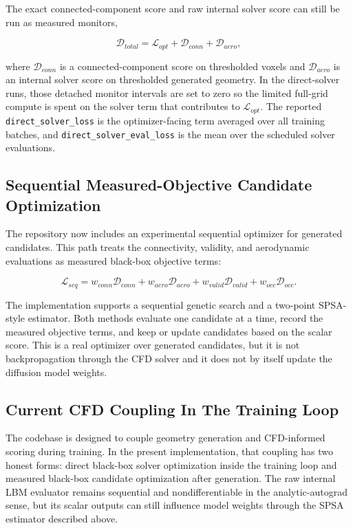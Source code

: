 The exact connected-component score and raw internal solver score can still be run as measured monitors,

\begin{equation}
\mathcal{D}_{total} = \mathcal{L}_{opt} + \mathcal{D}_{conn} + \mathcal{D}_{aero},
\end{equation}

where \(\mathcal{D}_{conn}\) is a connected-component score on thresholded voxels and \(\mathcal{D}_{aero}\) is an internal solver score on thresholded generated geometry. In the direct-solver runs, those detached monitor intervals are set to zero so the limited full-grid compute is spent on the solver term that contributes to \(\mathcal{L}_{opt}\). The reported \texttt{direct\_solver\_loss} is the optimizer-facing term averaged over all training batches, and \texttt{direct\_solver\_eval\_loss} is the mean over the scheduled solver evaluations.

\subsection{Sequential Measured-Objective Candidate Optimization}
The repository now includes an experimental sequential optimizer for generated candidates. This path treats the connectivity, validity, and aerodynamic evaluations as measured black-box objective terms:

\begin{equation}
\mathcal{L}_{seq} =
w_{conn}\mathcal{D}_{conn}
+ w_{aero}\mathcal{D}_{aero}
+ w_{valid}\mathcal{D}_{valid}
+ w_{occ}\mathcal{D}_{occ}.
\end{equation}

The implementation supports a sequential genetic search and a two-point SPSA-style estimator. Both methods evaluate one candidate at a time, record the measured objective terms, and keep or update candidates based on the scalar score. This is a real optimizer over generated candidates, but it is not backpropagation through the CFD solver and it does not by itself update the diffusion model weights.

\subsection{Current CFD Coupling In The Training Loop}
The codebase is designed to couple geometry generation and CFD-informed scoring during training. In the present implementation, that coupling has two honest forms: direct black-box solver optimization inside the training loop and measured black-box candidate optimization after generation. The raw internal LBM evaluator remains sequential and nondifferentiable in the analytic-autograd sense, but its scalar outputs can still influence model weights through the SPSA estimator described above.

